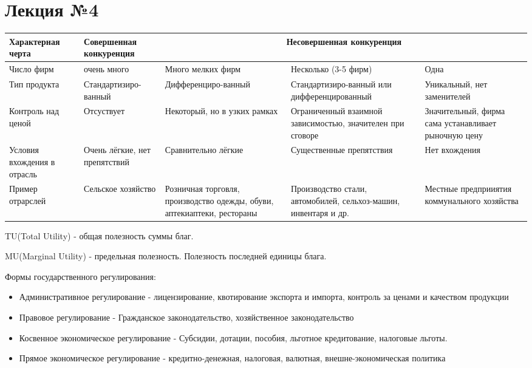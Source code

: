 \documentclass[a4paper, 12pt]{article}
\begin{document}
	\part{Лекция №4}
	\begin{center}
		\begin{tabular}{| m{6em} | m{7em} | m{7em} | m{7em} | m{7em} |}
			\hline
			Характерная черта & Совершенная конкуренция & \multicolumn{3}{c}{Несовершенная конкуренция} \\
			\hline
			Число фирм & очень много & Много мелких фирм & Несколько (3-5 фирм) &  Одна \\
			\hline
			Тип продукта & Стандартизиро-ванный & Дифференциро-ванный & Стандартизиро-ванный или дифференцированный & Уникальный, нет заменителей \\ [7ex]
			\hline
			Контроль над ценой  & Отсуствует & Некоторый, но в узких рамках & Ограниченный взаимной зависимостью, значителен при сговоре &  Значительный, фирма сама устанавливает рыночную цену \\
			\hline
			Условия вхождения в отрасль  & Очень лёгкие, нет препятствий & Сравнительно лёгкие & Существенные препятствия &  Нет вхождения \\
			\hline
			Пример отрарслей  & Сельское хозяйство & Розничная торговля, производство одежды, обуви, аптекиаптеки, рестораны & Производство стали, автомобилей, сельхоз-машин, инвентаря и др. &  Местные предприиятия коммунального хозяйства \\
			\hline
		\end{tabular}
	\end{center}
	
	TU(Total Utility) - общая полезность суммы благ.
	
	MU(Marginal Utility) - предельная полезность. Полезность последней единицы блага.
	
	Формы государственного регулирования:
	\begin{itemize}
		\item Административное регулирование - лицензирование, квотирование экспорта и импорта, контроль за ценами и качеством продукции
		\item Правовое регулирование - Гражданское законодательство, хозяйственное законодательство
		\item Косвенное экономическое регулирование - Субсидии, дотации, пособия, льготное кредитование, налоговые льготы.
		\item Прямое экономическое регулирование - кредитно-денежная, налоговая, валютная, внешне-экономическая политика
	\end{itemize}
\end{document}
